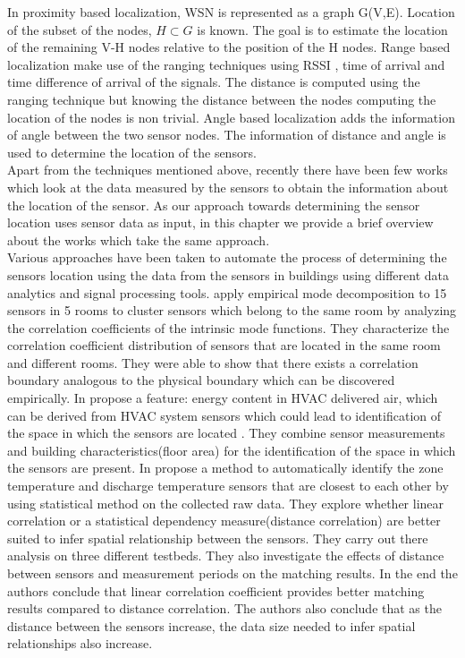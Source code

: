 In proximity based localization, WSN is represented as a graph G(V,E). Location of the  subset of the nodes, $H \subset G$ is known. The goal is to estimate the location of the remaining V-H nodes relative to the position of the H nodes. Range based localization make use of the ranging techniques using RSSI , time of arrival and time difference of arrival of the signals. The distance is computed using the ranging technique but knowing the distance between the nodes computing the location of the nodes is non trivial.   Angle based  localization adds the information of angle between the two sensor nodes. The information of distance and angle is used to determine the location of the sensors.\\
Apart from the techniques mentioned above, recently there have been few works which look at the data measured by the sensors to obtain the information about the location of the sensor. As our approach towards determining the sensor location uses sensor data as input, in this chapter we provide a brief overview about the works which take the same approach. \\
Various approaches have been taken to automate the process of determining the sensors location using the data from the sensors in buildings using different data analytics and signal processing tools. \citeauthor{Hong:2013:TAS:2528282.2528302}\cite{Hong:2013:TAS:2528282.2528302}
 apply empirical mode decomposition to 15 sensors in 5 rooms to cluster sensors which belong to the same room by analyzing the correlation coefficients of the intrinsic mode functions. They characterize the correlation coefficient distribution of sensors that are located in the
 same room and different rooms. They were able to show that there exists a correlation boundary analogous to the physical boundary which can be discovered empirically. 
In \cite{doi:10.1061/9780784413616.226} \citeauthor{doi:10.1061/9780784413616.226} propose a feature: energy content in HVAC delivered air, which can be derived from HVAC system sensors which could lead to identification of the space in which the sensors are located . They combine sensor measurements and building characteristics(floor area) for the identification of the space in which the sensors are present.
In \cite{Koc:2014:CLC:2674061.2674075} \citeauthor{Koc:2014:CLC:2674061.2674075} propose a method to automatically identify the zone temperature and discharge temperature sensors that are closest to each other by using statistical method on the collected raw data. They explore whether linear correlation or a statistical dependency measure(distance correlation) are better suited to infer spatial relationship between the sensors. They carry out there analysis on three different testbeds. They also investigate the effects of distance between sensors and measurement periods on the matching results. In the end the authors conclude that linear correlation coefficient provides better matching results compared to distance correlation. The authors also conclude that as the distance between the sensors increase, the data size needed to infer spatial relationships also increase.\\
